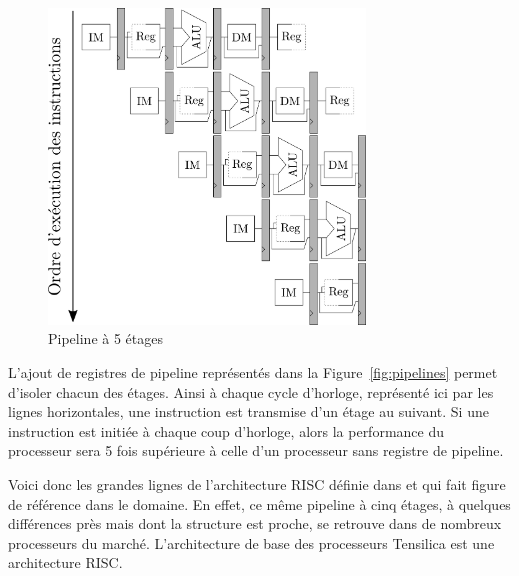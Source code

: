 \begin{figure}[t]
\centering
\includegraphics[width=0.75\textwidth]{main/ch3_fig/pipelines}
\caption{Pipeline à 5 étages}
\end{figure}


L'ajout de registres de pipeline représentés dans la Figure~\ref{fig:pipelines} permet d'isoler chacun des étages. Ainsi à chaque cycle d'horloge, représenté ici par les lignes horizontales, une instruction est transmise d'un étage au suivant. Si une instruction est initiée à chaque coup d'horloge, alors la performance du processeur sera 5 fois supérieure à celle d'un processeur sans registre de pipeline.

Voici donc les grandes lignes de l'architecture RISC définie dans \cite{hennessy2011computer} et qui fait figure de référence dans le domaine. En effet, ce même pipeline à cinq étages, à quelques différences près mais dont la structure est proche, se retrouve dans de nombreux processeurs du marché. L'architecture de base des processeurs Tensilica est une architecture RISC.

